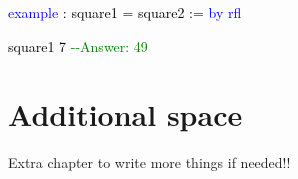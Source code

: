 \documentclass[
  letterpaper,
  DIV=11,
  numbers=noendperiod]{scrreprt}
\makeatletter
\newenvironment{Shaded}{\begin{snugshade}}{\end{snugshade}}
\newcommand{\CommentTok}[1]{\textcolor[rgb]{0.37,0.37,0.37}{#1}}
\newcommand{\DocumentationTok}[1]{\textcolor[rgb]{0.37,0.37,0.37}{\textit{#1}}}
\newcommand{\KeywordTok}[1]{\textcolor[rgb]{0.00,0.23,0.31}{#1}}
\newcommand{\NormalTok}[1]{\textcolor[rgb]{0.00,0.23,0.31}{#1}}
\newcommand{\SpecialCharTok}[1]{\textcolor[rgb]{0.37,0.37,0.37}{#1}}
\def\bluesquiggly{\bgroup \markoverwith{\textcolor[HTML]{1E90FF}{\lower3.5\p@\hbox{\sixly \char58}}}\ULon}
\renewcommand{\NormalTok}[1]{\textcolor[HTML]{000000}{#1}}
\renewcommand{\KeywordTok}[1]{\textcolor[HTML]{0000FF}{#1}}
\renewcommand{\SpecialCharTok}[1]{}
\renewcommand{\CommentTok}[1]{\textcolor[HTML]{008000}{#1}}
\renewcommand{\DocumentationTok}[1]{\bluesquiggly{\textcolor[HTML]{0000FF}{#1}}}
\theoremstyle{remark}
\makeatother
\begin{document}
\begin{Shaded}
\begin{Highlighting}[]
\KeywordTok{example}\NormalTok{ : square1 = square2 := }\KeywordTok{by} \KeywordTok{rfl}

\SpecialCharTok{++}\DocumentationTok{\#eval}\SpecialCharTok{::}\NormalTok{ square1 7     }\CommentTok{{-}{-}Answer: 49}
\end{Highlighting}
\end{Shaded}


\hypertarget{additional-space}{%
\chapter{Additional space}\label{additional-space}}

Extra chapter to write more things if needed!!
\end{document}
